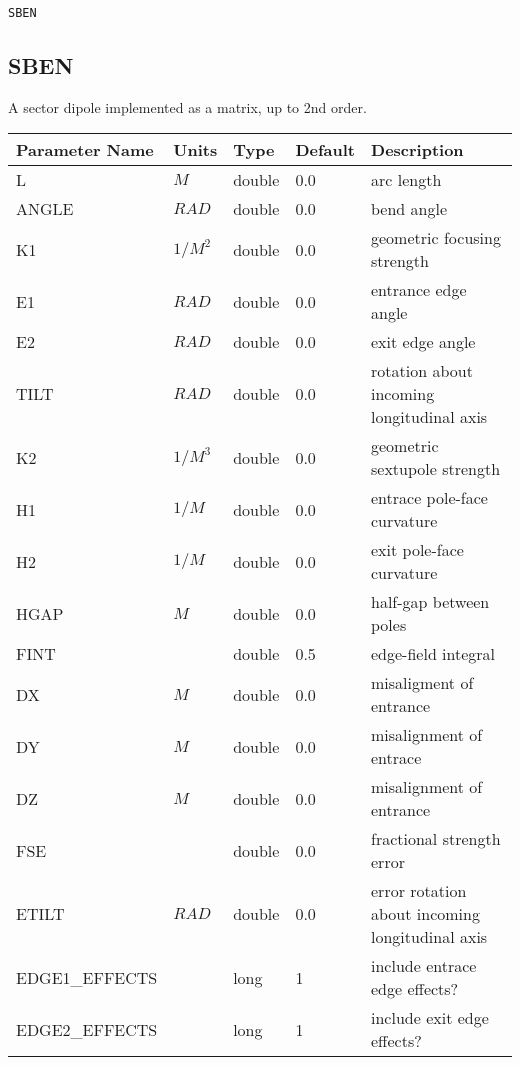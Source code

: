 \begin{latexonly}
\newpage
\begin{center}{\Large\verb|SBEN|}\end{center}
\end{latexonly}\subsection{SBEN}
A sector dipole implemented as a matrix, up to 2nd order.
\\
\begin{tabular}{|l|l|l|l|p{\descwidth}|} \hline
Parameter Name & Units & Type & Default & Description \\ \hline 
L & $M$ & double &  0.0 & arc length  \\ \hline 
ANGLE & $RAD$ & double &  0.0 & bend angle  \\ \hline 
K1 & $1/M^{2}$ & double &  0.0 & geometric focusing strength  \\ \hline 
E1 & $RAD$ & double &  0.0 & entrance edge angle  \\ \hline 
E2 & $RAD$ & double &  0.0 & exit edge angle  \\ \hline 
TILT & $RAD$ & double &  0.0 & rotation about incoming longitudinal axis  \\ \hline 
K2 & $1/M^{3}$ & double &  0.0 & geometric sextupole strength  \\ \hline 
H1 & $1/M$ & double &  0.0 & entrace pole-face curvature  \\ \hline 
H2 & $1/M$ & double &  0.0 & exit pole-face curvature  \\ \hline 
HGAP & $M$ & double &  0.0 & half-gap between poles  \\ \hline 
FINT &  & double &   0.5 & edge-field integral  \\ \hline 
DX & $M$ & double &  0.0 & misaligment of entrance  \\ \hline 
DY & $M$ & double &  0.0 & misalignment of entrace  \\ \hline 
DZ & $M$ & double &  0.0 & misalignment of entrance  \\ \hline 
FSE &  & double &  0.0 & fractional strength error  \\ \hline 
ETILT & $RAD$ & double &  0.0 & error rotation about incoming longitudinal axis  \\ \hline 
EDGE1\_EFFECTS &  & long &   1               & include entrace edge effects?  \\ \hline 
EDGE2\_EFFECTS &  & long &   1               & include exit edge effects?  \\ \hline 

\end{tabular}
